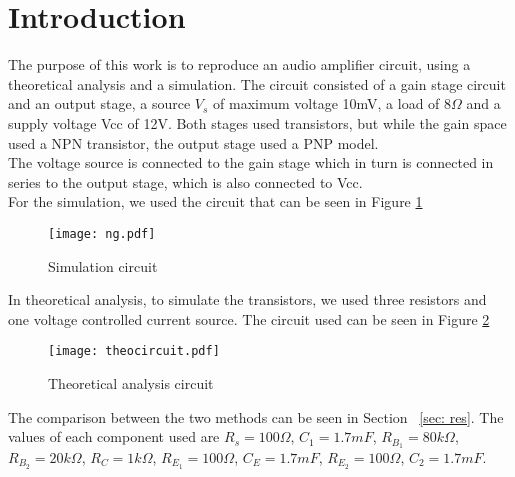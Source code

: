 \section{Introduction}
The purpose of this work is to reproduce an audio amplifier circuit, using a theoretical analysis and a simulation. The circuit consisted of a gain stage circuit and an output stage, a source $V_s$ of maximum voltage 10mV, a load of 8$\Omega$ and a supply voltage Vcc of 12V. Both stages used transistors, but while the gain space used a NPN transistor, the output stage used a PNP model.\\
The voltage source is connected to the gain stage which in turn is connected in series to the output stage, which is also connected to Vcc.\\
For the simulation, we used the circuit that can be seen in Figure \ref{fig:circngspice}
\begin{figure}[H] \centering
\texttt{[image: ng.pdf]}
\caption{Simulation circuit}
\label{fig:circngspice}
\end{figure} 
In theoretical analysis, to simulate the transistors, we used three resistors and one voltage controlled current source. The circuit used can be seen in Figure \ref{fig:circoc}

\begin{figure}[H] \centering
\texttt{[image: theocircuit.pdf]}
\caption{Theoretical analysis circuit}
\label{fig:circoc}
\end{figure} 
The comparison between the two methods can be seen in Section ~\ref{sec: res}.
The values of each component used are $R_s=100\Omega$, $C_1=1.7 mF$, $R_{B_1}=80k\Omega$, $R_{B_2}=20k\Omega$, $R_C=1k\Omega$, $R_{E_1}=100\Omega$, $C_E=1.7 mF$, $R_{E_2}=100\Omega$, $C_{2}=1.7mF$.

